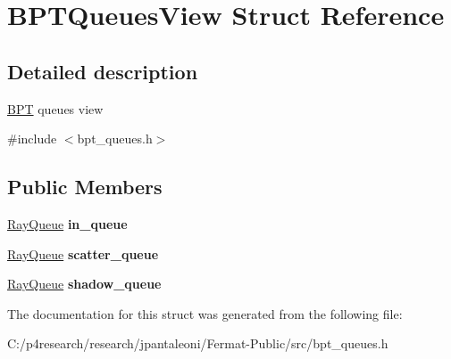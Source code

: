 \hypertarget{struct_b_p_t_queues_view}{}\section{B\+P\+T\+Queues\+View Struct Reference}
\label{struct_b_p_t_queues_view}


\subsection{Detailed description}
\hyperlink{struct_b_p_t}{B\+PT} queues view 

{\ttfamily \#include $<$bpt\+\_\+queues.\+h$>$}

\subsection*{Public Members}
\begin{DoxyCompactItemize}
\item 
\mbox{\label{struct_b_p_t_queues_view_add198a7a10e2408e94263ebe4c47e3bb}} 
\hyperlink{struct_ray_queue}{Ray\+Queue} {\bfseries in\+\_\+queue}
\item 
\mbox{\label{struct_b_p_t_queues_view_a460545254a8fe9d3e377c1e8f4ffc3c1}} 
\hyperlink{struct_ray_queue}{Ray\+Queue} {\bfseries scatter\+\_\+queue}
\item 
\mbox{\label{struct_b_p_t_queues_view_ab4dad286a7378c4a9714d50289cd9db1}} 
\hyperlink{struct_ray_queue}{Ray\+Queue} {\bfseries shadow\+\_\+queue}
\end{DoxyCompactItemize}


The documentation for this struct was generated from the following file\+:\begin{DoxyCompactItemize}
\item 
C\+:/p4research/research/jpantaleoni/\+Fermat-\/\+Public/src/bpt\+\_\+queues.\+h\end{DoxyCompactItemize}

